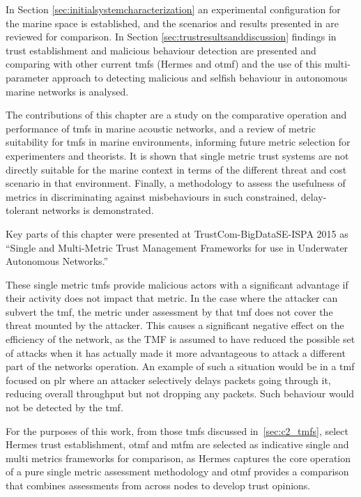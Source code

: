 In Section \ref{sec:initialsystemcharacterization} an experimental configuration for the marine space is established, and the scenarios and results presented in \cite{Guo11} are reviewed for comparison.
In Section \ref{sec:trustresultsanddiscussion} findings in trust establishment and malicious behaviour detection are presented and comparing with other current \glspl{tmf} (Hermes and \gls{otmf}) and the use of this multi-parameter approach to detecting malicious and selfish behaviour in autonomous marine networks is analysed.

The contributions of this chapter are a study on the comparative operation and performance of \glspl{tmf} in marine acoustic networks, and a review of metric suitability for \glspl{tmf} in marine environments, informing future metric selection for experimenters and theorists.
It is shown that single metric trust systems are not directly suitable for the marine context in terms of the different threat and cost scenario in that environment.
Finally, a methodology to assess the usefulness of metrics in discriminating against misbehaviours in such constrained, delay-tolerant networks is demonstrated.

Key parts of this chapter were presented at TrustCom-BigDataSE-ISPA 2015 as ``Single and Multi-Metric Trust Management Frameworks for use in Underwater Autonomous Networks.''\cite{Bolster2015}

These single metric \glspl{tmf} provide malicious actors with a significant advantage if their activity does not impact that metric.
In the case where the attacker can subvert the \gls{tmf}, the metric under assessment by that \gls{tmf} does not cover the threat mounted by the attacker.
This causes a significant negative effect on the efficiency of the network, as the TMF is assumed to have reduced the possible set of attacks when it has actually made it more advantageous to attack a different part of the networks operation.
An example of such a situation would be in a \gls{tmf} focused on \gls{plr} where an attacker selectively delays packets going through it, reducing overall throughput but not dropping any packets.
Such behaviour would not be detected by the \gls{tmf}.

For the purposes of this work, from those \glspl{tmf} discussed in~\autoref{sec:c2_tmfs}, select Hermes trust establishment, \gls{otmf} and \gls{mtfm} are selected as indicative single and multi metrics frameworks for comparison, as Hermes captures the core operation of a pure single metric assessment methodology and \gls{otmf} provides a comparison that combines assessments from across nodes to develop trust opinions.

